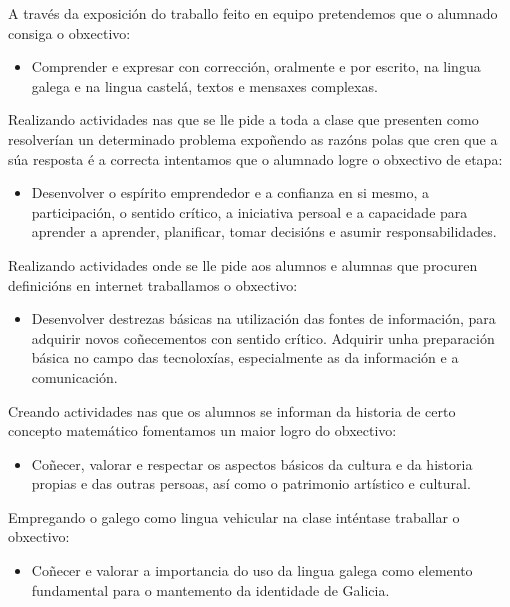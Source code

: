 A través da exposición do traballo feito en equipo pretendemos que o alumnado consiga o obxectivo:

\begin{itemize}
    \item Comprender e expresar con corrección, oralmente e por escrito, na lingua galega e na lingua castelá, textos e mensaxes complexas.
\end{itemize}

Realizando actividades nas que se lle pide a toda a clase que presenten como resolverían un determinado problema expoñendo as razóns polas que cren que a súa resposta é a correcta intentamos que o alumnado logre o obxectivo de etapa:
\begin{itemize}
    \item Desenvolver o espírito emprendedor e a confianza en si mesmo, a participación, o sentido crítico, a iniciativa persoal e a capacidade para aprender a aprender, planificar, tomar decisións e asumir responsabilidades.
\end{itemize}

Realizando actividades onde se lle pide aos alumnos e alumnas que procuren definicións en internet traballamos o obxectivo:
\begin{itemize}
    \item Desenvolver destrezas básicas na utilización das fontes de información, para adquirir novos coñecementos con sentido crítico. Adquirir unha preparación básica no campo das tecnoloxías, especialmente as da información e a comunicación.
\end{itemize}

Creando actividades nas que os alumnos se informan da historia de certo concepto matemático fomentamos un maior logro do obxectivo:

\begin{itemize}
    \item Coñecer, valorar e respectar os aspectos básicos da cultura e da historia propias e das outras persoas, así como o patrimonio artístico e cultural.
\end{itemize}

Empregando o galego como lingua vehicular na clase inténtase traballar o obxectivo:

\begin{itemize}
    \item Coñecer e valorar a importancia do uso da lingua galega como elemento fundamental para o mantemento da identidade de Galicia.
\end{itemize}
